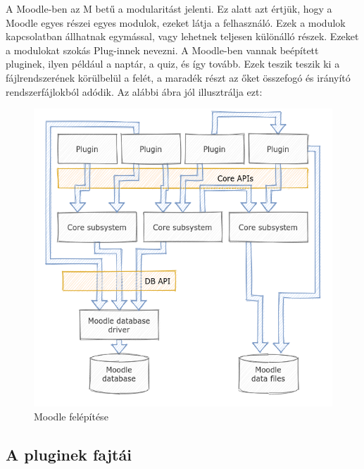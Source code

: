A Moodle-ben az M betű a modularitást jelenti. Ez alatt azt értjük, hogy a Moodle egyes részei egyes modulok, ezeket látja a felhasználó. Ezek a modulok kapcsolatban állhatnak egymással, vagy lehetnek teljesen különálló részek. Ezeket a modulokat szokás Plug-innek nevezni. A Moodle-ben vannak beépített pluginek, ilyen például a naptár, a quiz, és így tovább. Ezek teszik teszik ki a fájlrendszerének körülbelül a felét, a maradék részt az őket összefogó és irányító rendszerfájlokból adódik. Az alábbi ábra jól illusztrálja ezt:

\begin{figure}
    \centering
    \includegraphics[scale=0.7]{Fejezetek/Images/moodleBuild.png} 
    \caption{\label{Moodle}Moodle felépítése}
\end{figure}

\subsection{A pluginek fajtái}

